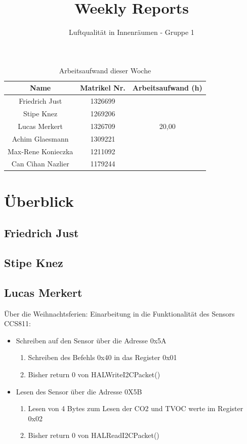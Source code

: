 \documentclass[]{article}
\title{Weekly Reports}
\author{Luftqualität in Innenräumen - Gruppe 1}
\begin{document}
\maketitle

\begin{table}[h!]
	\centering
	\begin{tabular}{|c|c|c|}
		\hline
		{\textbf{Name}}				&		{\textbf{Matrikel Nr.}} & {\textbf{Arbeitsaufwand (h)}} \\
		\hline
		Friedrich Just				&		1326699 				&		\\
		\hline
		Stipe Knez				&		1269206 				&		\\
		\hline
		Lucas Merkert				&		1326709					&	20,00	\\
		\hline
		Achim Glaesmann				&		1309221					&		\\
		\hline
		Max-Rene Konieczka			&		1211092					&		\\
		\hline
		Can Cihan Nazlier			&		1179244					&		\\
		\hline
	\end{tabular}
	\caption{Arbeitsaufwand dieser Woche}
	\label{tab:worakload}
\end{table}



\section{Überblick}


\subsection{Friedrich Just}

\subsection{Stipe Knez}

\subsection{Lucas Merkert}
Über die Weihnachtsferien: Einarbeitung in die Funktionalität des Sensors CCS811:
\begin{itemize}
	\item Schreiben auf den Sensor über die Adresse 0x5A
	\begin{enumerate}
		\item Schreiben des Befehls 0x40 in das Register 0x01
		\item Bisher return 0 von HALWriteI2CPacket()
	\end{enumerate}
	\item Lesen des Sensor über die Adresse 0X5B
		\begin{enumerate}
			\item Lesen von 4 Bytes zum Lesen der CO2 und TVOC werte im Register 0x02
			\item Bisher return 0 von HALReadI2CPacket()
		\end{enumerate}
	\end{itemize}
\end{document}
